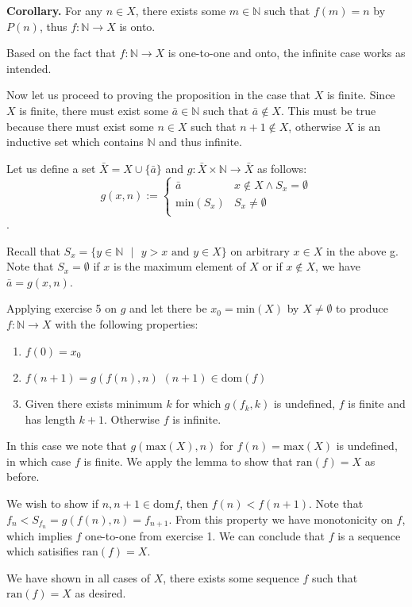 \documentclass{article}
\newcommand{ \dom }[0]{\text{dom}}
\begin{document}
\begin{enumerate}
				\medskip
				\textbf{Corollary.}
			For any $n \in X$, there exists some $m \in \mathbb{N}$ such that $f(m) = n$ by $P(n)$, thus $f: \mathbb{N} \xrightarrow{} X$ is onto.
			
			\medskip
			Based on the fact that $f: \mathbb{N} \xrightarrow{} X$ is one-to-one and onto, the infinite case works as intended.
			
			\medskip
			Now let us proceed to proving the proposition in the case that $X$ is finite. Since $X$ is finite, there must exist some $\bar{a} \in \mathbb{N}$ such that $\bar{a} \notin X$. This must be true because there must exist some $n \in X$ such that $n + 1 \notin X$, otherwise $X$ is an inductive set which contains $\mathbb{N}$ and thus infinite. 
			
			\medskip
			Let us define a set $\bar{X} = X \cup \{\bar{a}\}$ and $g: \bar{X} \times \mathbb{N} \xrightarrow{} \bar{X}$ as follows:
			$$g(x, n) := 
			\begin{cases}
				\bar{a} & x \notin X \land S_x = \emptyset\\
				\text{min}(S_x) & S_x \neq \emptyset\\
			\end{cases}$$.
			
			
			Recall that $S_x = \{y \in \mathbb{N} \text{ } | \text{ } y > x \text{ and } y \in X \}$ on arbitrary $x \in X$ in the above g. Note that $S_x = \emptyset$ if $x$ is the maximum element of $X$ or if $x \notin X$, we have $\bar{a} = g(x,n)$.
			
			\medskip
			Applying exercise 5 on $g$ and let there be $x_0 = \text{min}(X)$ by $X \neq \emptyset$ to produce $f: \mathbb{N} \xrightarrow{} X$ with the following properties:
			
			
			\begin{enumerate}
				\item $f(0) = x_0$
				\item $f(n + 1) = g(f(n), n)$  $(n + 1) \in \dom(f)$
				\item Given there exists minimum $k$ for which $g(f_k, k)$ is undefined, $f$ is finite and has length $k + 1$. Otherwise $f$ is infinite.
			\end{enumerate}
			
			In this case we note that $g(\text{max}(X), n)$ for $f(n) = \text{max}(X)$ is undefined, in which case $f$ is finite. We apply the lemma to show that $\text{ran}(f) = X$ as before.
			
			We wish to show if $n, n + 1 \in \dom{f}$, then $f(n) < f(n + 1)$.
			Note that $f_n < S_{f_{n}} = g(f(n), n) = f_{n + 1}$. From this property we have monotonicity on $f$, which implies $f$ one-to-one from exercise 1. We can conclude that $f$ is a sequence which satisifies $\text{ran}(f) = X$. 
			
			\medskip
			We have shown in all cases of $X$, there exists some sequence $f$ such that $\text{ran}(f) = X$ as desired.

	\end{enumerate}
	
\end{document}
